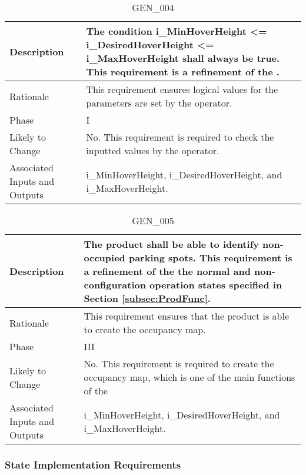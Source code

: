 \documentclass{article}
\begin{document}
\begin{table}[!h]
\begin{center}
\caption {GEN\_004} 
\label{GEN_004}
\begin{tabular}{ | m{3cm} | m{11cm} | }
\hline
Description & The condition i\_MinHoverHeight <= i\_DesiredHoverHeight <= i\_MaxHoverHeight shall always be true. This requirement is a refinement of the \nameref{Configure State}. \\
\hline
Rationale & This requirement ensures logical values for the parameters are set by the operator. \\
\hline
Phase & I \\
\hline
Likely to Change & No. This requirement is required to check the inputted values by the operator. \\
\hline
Associated Inputs and Outputs & i\_MinHoverHeight, i\_DesiredHoverHeight, and i\_MaxHoverHeight. \\
\hline
\end{tabular}
\end{center}
\end{table}

\begin{table}[!h]
\begin{center}
\caption {GEN\_005} 
\label{GEN_005}
\begin{tabular}{ | m{3cm} | m{11cm} | }
\hline
Description & The product shall be able to identify non-occupied parking spots. This requirement is a refinement of the the normal and non-configuration operation states specified in Section \ref{subsec:ProdFunc}. \\
\hline
Rationale & This requirement ensures that the product is able to create the occupancy map. \\
\hline
Phase & III \\
\hline
Likely to Change & No. This requirement is required to create the occupancy map, which is one of the main functions of the  \\
\hline
Associated Inputs and Outputs & i\_MinHoverHeight, i\_DesiredHoverHeight, and i\_MaxHoverHeight. \\
\hline
\end{tabular}
\end{center}
\end{table}

\subsubsection{State Implementation Requirements}
\end{document}
